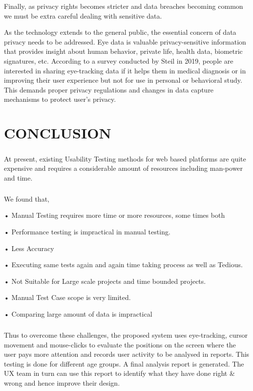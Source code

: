 \documentclass[hidelinks,12pt,a4paper,final]{extreport}
\begin{document}
Finally, as privacy rights becomes stricter and data breaches becoming common we must be extra careful dealing with sensitive data.

As the technology extends to the general public, the essential concern of data privacy needs to be addressed. Eye data is valuable privacy-sensitive information that provides insight about human behavior, private life, health data, biometric signatures, etc. According to a survey conducted by Steil in 2019, people are interested in sharing eye-tracking data if it helps them in medical diagnosis or in improving their user experience but not for use in personal or behavioral study. This demands proper privacy regulations and changes in data capture mechanisms to protect user’s privacy.

\newpage
\chapter{CONCLUSION}
\paragraph{}
At present, existing Usability Testing methods for web based platforms are quite expensive and requires a considerable amount of resources including man-power and time.
\paragraph{}
\noindent 
We found that,

• Manual Testing requires more time or more resources, some times both

• Performance testing is impractical in manual testing.

• Less Accuracy

• Executing same tests again and again time taking process as well as Tedious.

• Not Suitable for Large scale projects and time bounded projects.

• Manual Test Case scope is very limited.

• Comparing large amount of data is impractical

\paragraph{}
Thus to overcome these challenges, the proposed system uses eye-tracking, cursor movement and mouse-clicks to evaluate the positions on the screen where the user pays more attention and records user activity to be analysed in reports. This testing is done for different age groups. A final analysis report is generated. The UX team in turn can use this report to identify what they have done right \& wrong and hence improve their design. 
\end{document}
